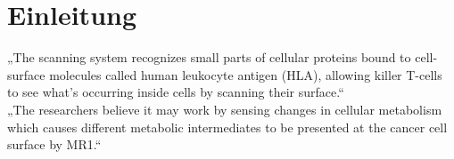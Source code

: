 \pagestyle{headings}

\section{Einleitung}

„The scanning system recognizes small parts of cellular proteins bound to cell-surface molecules called human leukocyte antigen (HLA), allowing killer T-cells to see what’s occurring inside cells by scanning their surface.“\\
„The researchers believe it may work by sensing changes in cellular metabolism which causes different metabolic intermediates to be presented at the cancer cell surface by MR1.“
